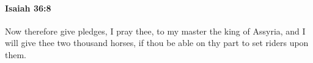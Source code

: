 
		\paragraph{Isaiah 36:8} %
			\label{ISAIAH-36-8}

			Now therefore give pledges, I pray thee, to my master the king of Assyria, and I will give thee two thousand horses, if thou be able on thy part to set riders upon them.


